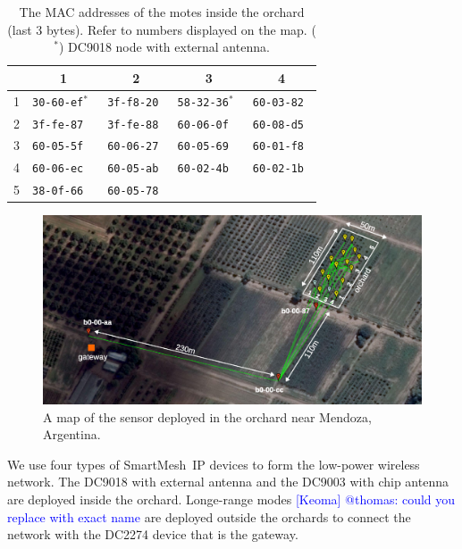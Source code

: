 \documentclass{sig-alternate}
\newcommand{\keoma}[1]       {\textcolor{blue}{[Keoma] #1}}
\newcommand{\smip}           {SmartMesh~IP\xspace}
\begin{document}
\begin{table}
\begin{center}
    \begin{tabular}{ | l | l | l | l | l |}
         \hline
           & \multicolumn{1}{|c|}{1} & \multicolumn{1}{|c|}{2} & \multicolumn{1}{|c|}{3} & \multicolumn{1}{|c|}{4}\\
         \hline
         1 & \tt{30-60-ef}$^*$ & \tt{3f-f8-20} & \tt{58-32-36}$^*$ & \tt{60-03-82} \\
         2 & \tt{3f-fe-87}     & \tt{3f-fe-88} & \tt{60-06-0f}     & \tt{60-08-d5} \\
         3 & \tt{60-05-5f}     & \tt{60-06-27} & \tt{60-05-69}     & \tt{60-01-f8} \\
         4 & \tt{60-06-ec}     & \tt{60-05-ab} & \tt{60-02-4b}     & \tt{60-02-1b} \\
         5 & \tt{38-0f-66}     & \tt{60-05-78} &                   &               \\
         \hline
    \end{tabular}
    \caption{The MAC addresses of the motes inside the orchard (last 3 bytes). Refer to numbers displayed on the map. ($^*$) DC9018 node with external antenna.}
\end{center}
\end{table}

\begin{figure}
    \centering
    \includegraphics[width=\textwidth]{map_annotated}
    \caption{A map of the sensor deployed in the orchard near Mendoza, Argentina.}
    \label{fig:map}
\end{figure}


We use four types of \smip devices to form the low-power wireless network.
The DC9018 with external antenna and the DC9003 with chip antenna are deployed inside the orchard.
Longe-range modes \keoma{@thomas: could you replace with exact name} are deployed outside the orchards to connect the network with the DC2274 device that is the gateway.
\end{document}
